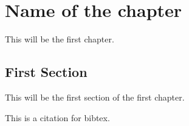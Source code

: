 

\chapter{Name of the chapter}

This will be the first chapter.

\section{First Section}

This will be the first section of the first chapter.

This is a citation for bibtex. \cite{Nobody06}
